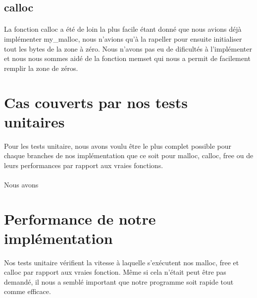 \documentclass[10pt,a4paper]{article}
\begin{document}
\subsection{calloc}

\paragraph{}La fonction calloc a été de loin la plus facile étant donné que nous avions déjà implémenter my\_malloc, nous n'avions qu'à la rapeller pour ensuite initialiser tout les bytes de la zone à zéro. Nous n'avons pas eu de dificultés à l'implémenter et nous nous sommes aidé de la fonction memset qui nous a permit de facilement remplir la zone de zéros.


\section{Cas couverts par nos tests unitaires}

\paragraph{}Pour les tests unitaire, nous avons voulu être le plus complet possible pour chaque branches de nos implémentation que ce soit pour malloc, calloc, free ou de leurs performances par rapport aux vraies fonctions.

\paragraph{}Nous avons 


\section{Performance de notre implémentation}

\paragraph{}Nos tests unitaire vérifient la vitesse à laquelle s'exécutent nos malloc, free et calloc par rapport aux vraies fonction. Même si cela n'était peut être pas demandé, il nous a semblé important que notre programme soit rapide tout comme efficace.




\end{document}

